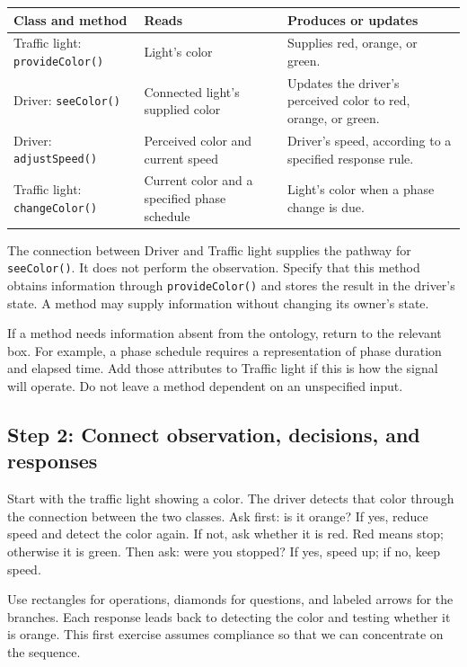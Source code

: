 \documentclass[11pt,a4paper]{article}
\begin{document}
\begin{center}
\renewcommand{\arraystretch}{1.2}
\begin{tabularx}{\linewidth}{@{}p{3.5cm}YY@{}}
\toprule
\textbf{Class and method} & \textbf{Reads} & \textbf{Produces or updates}\\
\midrule
Traffic light: \texttt{provideColor()} & Light's color & Supplies red, orange, or green.\\
Driver: \texttt{seeColor()} & Connected light's supplied color & Updates the driver's perceived color to red, orange, or green.\\
Driver: \texttt{adjustSpeed()} & Perceived color and current speed & Driver's speed, according to a specified response rule.\\
Traffic light: \texttt{changeColor()} & Current color and a specified phase schedule & Light's color when a phase change is due.\\
\bottomrule
\end{tabularx}
\end{center}

The connection between Driver and Traffic light supplies the pathway for \texttt{seeColor()}. It does not perform the observation. Specify that this method obtains information through \texttt{provideColor()} and stores the result in the driver's state. A method may supply information without changing its owner's state.

If a method needs information absent from the ontology, return to the relevant box. For example, a phase schedule requires a representation of phase duration and elapsed time. Add those attributes to Traffic light if this is how the signal will operate. Do not leave a method dependent on an unspecified input.

\subsection{Step 2: Connect observation, decisions, and responses}

Start with the traffic light showing a color. The driver detects that color through the connection between the two classes. Ask first: is it orange? If yes, reduce speed and detect the color again. If not, ask whether it is red. Red means stop; otherwise it is green. Then ask: were you stopped? If yes, speed up; if no, keep speed.

Use rectangles for operations, diamonds for questions, and labeled arrows for the branches. Each response leads back to detecting the color and testing whether it is orange. This first exercise assumes compliance so that we can concentrate on the sequence.
\end{document}
